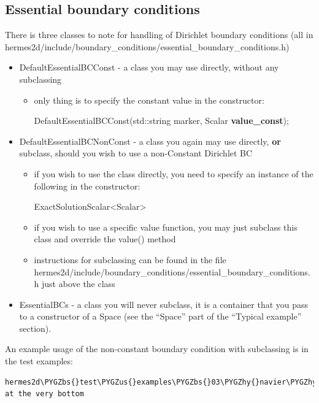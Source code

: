 \documentclass[a4paper,0pt,english]{sphinxmanual}
\def\PYGZbs{\char`\\}
\def\PYGZus{\char`\_}
\def\PYGZhy{\char`\-}
\begin{document}
\subsection{Essential boundary conditions}
\label{src/hermesOO:essential-boundary-conditions}
There is three classes to note for handling of Dirichlet boundary conditions (all in hermes2d/include/boundary\_conditions/essential\_boundary\_conditions.h)
\begin{itemize}
\item {} 
DefaultEssentialBCConst - a class you may use directly, without any subclassing
\begin{itemize}
\item {} 
only thing is to specify the constant value in the constructor:

DefaultEssentialBCConst(std::string marker, Scalar \textbf{value\_const});

\end{itemize}

\item {} 
DefaultEssentialBCNonConst - a class you again may use directly, \textbf{or} subclass, should you wish to use a non-Constant Dirichlet BC
\begin{itemize}
\item {} 
if you wish to use the class directly, you need to specify an instance of the following in the constructor:

ExactSolutionScalar\textless{}Scalar\textgreater{}

\item {} 
if you wish to use a specific value function, you may just subclass this class and override the value() method

\item {} 
instructions for subclassing can be found in the file hermes2d/include/boundary\_conditions/essential\_boundary\_conditions.h just above the class

\end{itemize}

\item {} 
EssentialBCs - a class you will never subclass, it is a container that you pass to a constructor of a Space (see the ``Space'' part of the ``Typical example'' section).

\end{itemize}

An example usage of the non-constant boundary condition with subclassing is in the test examples:

\begin{Verbatim}[commandchars=\\\{\}]
hermes2d\PYGZbs{}test\PYGZus{}examples\PYGZbs{}03\PYGZhy{}navier\PYGZhy{}stokes\PYGZbs{}definitions.cpp at the very bottom
\end{Verbatim}
\end{document}
